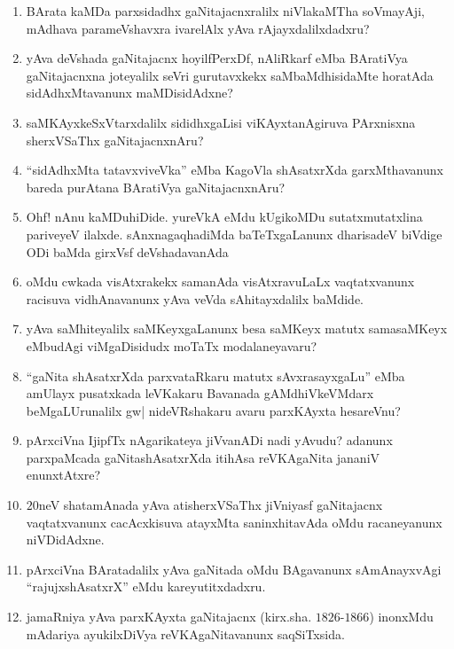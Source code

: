 \begin{enumerate}
\item BArata kaMDa parxsidadhx gaNitajacnxralilx niVlakaMTha soVmayAji, mAdhava parameVshavxra ivarelAlx yAva rAjayxdalilxdadxru?
  
\item yAva deVshada gaNitajacnx hoyilfPerxDf, nAliRkarf eMba BAratiVya gaNitajacnxna joteyalilx seVri gurutavxkekx saMbaMdhisidaMte horatAda sidAdhxMtavanunx maMDisidAdxne?
  
\item saMKAyxkeSxVtarxdalilx sididhxgaLisi viKAyxtanAgiruva PArxnisxna sherxVSaThx gaNitajacnxnAru?
  
\item ``sidAdhxMta tatavxviveVka'' eMba KagoVla shAsatxrXda garxMthavanunx bareda purAtana BAratiVya gaNitajacnxnAru?
  
\item Ohf! nAnu kaMDuhiDide. yureVkA eMdu kUgikoMDu sutatxmutatxlina pariveyeV ilalxde. sAnxnagaqhadiMda baTeTxgaLanunx dharisadeV biVdige ODi baMda girxVsf deVshadavanAda
  
\item oMdu cwkada visAtxrakekx samanAda visAtxravuLaLx vaqtatxvanunx racisuva vidhAnavanunx yAva veVda sAhitayxdalilx baMdide.
  
\item yAva saMhiteyalilx saMKeyxgaLanunx besa saMKeyx matutx samasaMKeyx eMbudAgi viMgaDisidudx moTaTx modalaneyavaru?
  
\item ``gaNita shAsatxrXda parxvataRkaru matutx sAvxrasayxgaLu'' eMba amUlayx pusatxkada leVKakaru Bavanada gAMdhiVkeVMdarx beMgaLUrunalilx gw| nideVRshakaru avaru parxKAyxta hesareVnu?

\item pArxciVna IjipfTx nAgarikateya jiVvanADi nadi yAvudu? adanunx parxpaMcada gaNitashAsatxrXda itihAsa reVKAgaNita jananiV enunxtAtxre?
  
\item $20$neV shatamAnada yAva atisherxVSaThx jiVniyasf gaNitajacnx vaqtatxvanunx cacAcxkisuva atayxMta saninxhitavAda oMdu racaneyanunx niVDidAdxne.
  
\item pArxciVna BAratadalilx yAva gaNitada oMdu BAgavanunx sAmAnayxvAgi ``rajujxshAsatxrX'' eMdu kareyutitxdadxru.
  
\item jamaRniya yAva parxKAyxta gaNitajacnx (kirx.sha. $1826$-$1866$) inonxMdu mAdariya ayukilxDiVya reVKAgaNitavanunx saqSiTxsida.
  

\end{enumerate}

